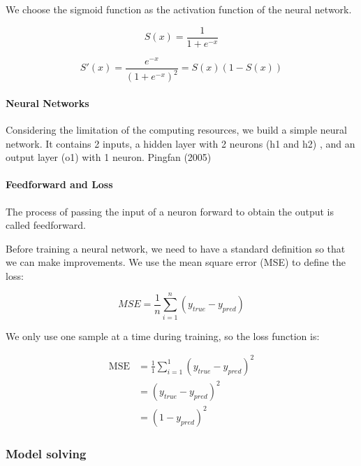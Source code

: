 \documentclass[12pt,a4paper,]{article}
\let\oldparagraph\paragraph
\renewcommand{\paragraph}[1]{\oldparagraph{#1}\mbox{}}
\begin{document}
We choose the sigmoid function as the activation function of the neural
network.

\begin{equation}
S(x) = \frac{1}{1 + e^{-x}}
\end{equation}

\begin{equation}
S'(x) = \frac{e^{-x}}{(1 + e^{-x})^2} = S(x)(1-S(x))
\end{equation}

\hypertarget{neural-networks}{%
\paragraph{Neural Networks}\label{neural-networks}}

Considering the limitation of the computing resources, we build a simple
neural network. It contains 2 inputs, a hidden layer with 2 neurons (h1
and h2) , and an output layer (o1) with 1 neuron. Pingfan (2005)

\hypertarget{feedforward-and-loss}{%
\paragraph{Feedforward and Loss}\label{feedforward-and-loss}}

The process of passing the input of a neuron forward to obtain the
output is called feedforward.

Before training a neural network, we need to have a standard definition
so that we can make improvements. We use the mean square error (MSE) to
define the loss:

\begin{equation}
MSE = \frac{1}{n} \sum_{i=1}^n (y_{true} - y_{pred}) 
\end{equation}

We only use one sample at a time during training, so the loss function
is:

\begin{equation}
 \begin{aligned} \mathrm{MSE} &=\frac{1}{1} \sum_{i=1}^{1}\left(y_{t r u e}-y_{p r e d}\right)^{2} \\ &=\left(y_{t r u e}-y_{p r e d}\right)^{2} \\ &=\left(1-y_{p r e d}\right)^{2} \end{aligned} 
\end{equation}

\hypertarget{model-solving-1}{%
\subsubsection{Model solving}\label{model-solving-1}}
\end{document}
